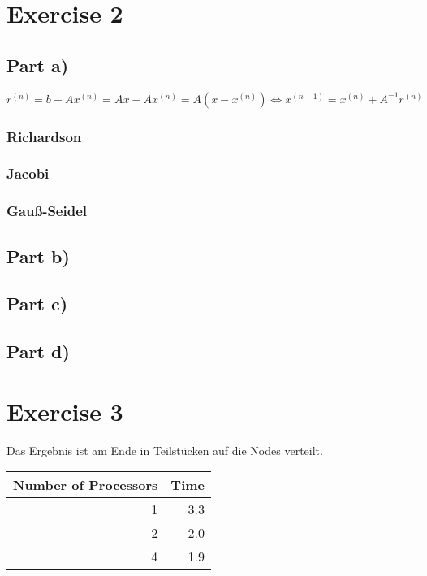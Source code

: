 \documentclass[10pt,a4paper]{article}
\begin{document}
\section*{Exercise 2}

\subsection*{Part a)}

\begin{equation*}
  r^{(n)} = b - Ax^{(n)} = Ax - Ax^{(n)} = A(x - x^{(n)}) \Leftrightarrow x^{(n + 1)} = x^{(n)} + A^{-1}r^{(n)}
\end{equation*}

\subsubsection*{Richardson}

\subsubsection*{Jacobi}

\subsubsection*{Gauß-Seidel}

\subsection*{Part b)}

\subsection*{Part c)}

\subsection*{Part d)}

\section*{Exercise 3}

Das Ergebnis ist am Ende in Teilstücken auf die Nodes verteilt.

\begin{tabular}{rr}
Number of Processors & Time\\
\hline
1 & 3.3\\
2 & 2.0\\
4 & 1.9\\
\end{tabular}
\begin{comment}
#+ORGTBL: SEND exercise-3 orgtbl-to-latex :splice nil :skip 0
| Number of Processors | Time |
|----------------------+------|
|                    1 |  3.3 |
|                    2 |  2.0 |
|                    4 |  1.9 |
\end{comment}
\end{document}

